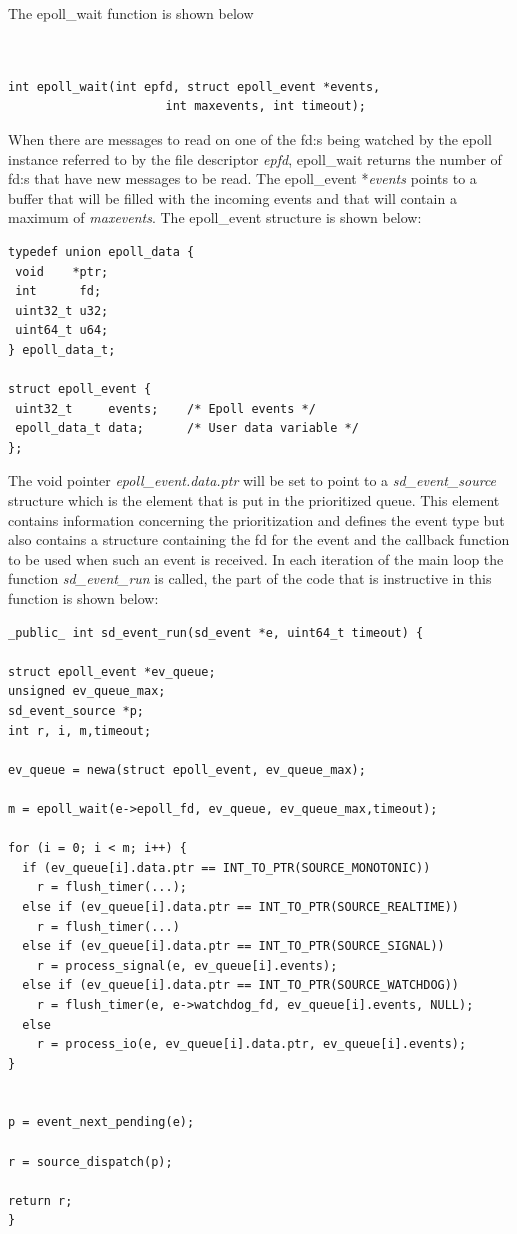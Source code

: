 \documentclass[nobiblatex]{LTHthesis}
\begin{document}
The epoll\_wait function is shown below
\begin{verbatim}


int epoll_wait(int epfd, struct epoll_event *events,
                      int maxevents, int timeout);	 
\end{verbatim}
When there are messages to read on one of the fd:s being watched by the epoll instance referred to by the file descriptor \emph{epfd}, epoll\_wait returns the number of fd:s that have new messages to be read.
The epoll\_event *\emph{events} points to a buffer that will be filled with the incoming events and that will contain a maximum of \emph{maxevents}.
The epoll\_event structure is shown below:

%

\begin{verbatim}
typedef union epoll_data {
 void    *ptr;
 int      fd;
 uint32_t u32;
 uint64_t u64;
} epoll_data_t;

struct epoll_event {
 uint32_t     events;    /* Epoll events */
 epoll_data_t data;      /* User data variable */
};
\end{verbatim}

The void pointer \emph{epoll\_event.data.ptr} will be set to point to a \emph{sd\_event\_source} structure which is the element that is put in the prioritized queue. This element contains information concerning the prioritization and  defines the event type but also contains a structure containing the fd for the event and the callback function to be used when such an event is received.
In each iteration of the main loop the function \emph{sd\_event\_run} is called, the part of the code that is instructive in this function is shown below:

\begin{verbatim}
_public_ int sd_event_run(sd_event *e, uint64_t timeout) {

struct epoll_event *ev_queue;
unsigned ev_queue_max;
sd_event_source *p;
int r, i, m,timeout;
            
ev_queue = newa(struct epoll_event, ev_queue_max);

m = epoll_wait(e->epoll_fd, ev_queue, ev_queue_max,timeout);

for (i = 0; i < m; i++) {
  if (ev_queue[i].data.ptr == INT_TO_PTR(SOURCE_MONOTONIC))
    r = flush_timer(...);
  else if (ev_queue[i].data.ptr == INT_TO_PTR(SOURCE_REALTIME))
    r = flush_timer(...)
  else if (ev_queue[i].data.ptr == INT_TO_PTR(SOURCE_SIGNAL))
    r = process_signal(e, ev_queue[i].events);
  else if (ev_queue[i].data.ptr == INT_TO_PTR(SOURCE_WATCHDOG))
    r = flush_timer(e, e->watchdog_fd, ev_queue[i].events, NULL);
  else
    r = process_io(e, ev_queue[i].data.ptr, ev_queue[i].events);
}


p = event_next_pending(e);

r = source_dispatch(p);

return r;
}
\end{verbatim}
\end{document}
